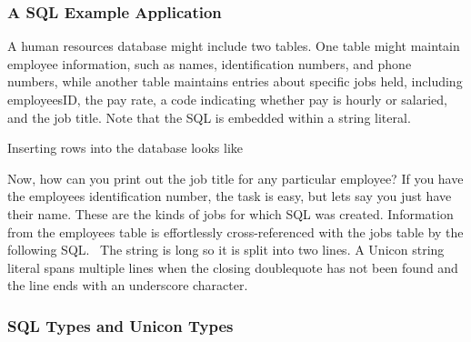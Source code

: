 \subsubsection[A SQL Example Application]{A SQL Example Application}
A human resources database might include two tables. One
table might maintain employee information, such as names,
identification numbers, and phone numbers, while another table
maintains entries about specific jobs held, including
employee{\textquotesingle}sID, the pay rate, a code indicating whether
pay is hourly or salaried, and the job title. Note that the SQL is
embedded within a string literal.


\noindent
Inserting rows into the database looks like


Now, how can you print out the job title for any particular employee? If
you have the employee{\textquotesingle}s identification number, the
task is easy, but let{\textquotesingle}s say you just have their name.
These are the kinds of jobs for which SQL was created. Information from
the employees table is effortlessly cross-referenced with the jobs
table by the following SQL. \ The string is long so it is split into
two lines. A Unicon string literal spans multiple lines when the
closing doublequote has not been found and the line ends with an
underscore character.


\subsubsection{SQL Types and Unicon Types}

